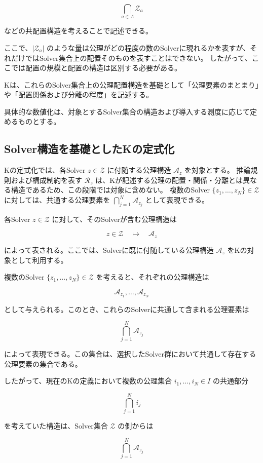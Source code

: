 \[
\bigcap_{a\in A}\mathcal{Z}_a
\]

などの共配置構造を考えることで記述できる。

ここで、$|\mathcal{Z}_a|$ のような量は公理がどの程度の数のSolverに現れるかを表すが、それだけではSolver集合上の配置そのものを表すことはできない。
したがって、ここでは配置の規模と配置の構造は区別する必要がある。

Kは、これらのSolver集合上の公理配置構造を基礎として「公理要素のまとまり」や「配置関係および分離の程度」を記述する。

具体的な数値化は、対象とするSolver集合の構造および導入する測度に応じて定めるものとする。

\subsection{Solver構造を基礎としたKの定式化}

Kの定式化では、各Solver $z\in\mathcal{Z}$ に付随する公理構造 $\mathcal{A}_z$ を対象とする。
推論規則および構成制約を表す $\mathcal{R}_z$ は、Kが記述する公理の配置・関係・分離とは異なる構造であるため、この段階では対象に含めない。
複数のSolver $\{z_1,\ldots,z_N\}\in\mathcal{Z}$ に対しては、共通する公理要素を $\bigcap_{j=1}^{N}\mathcal{A}_{z_j}$ として表現できる。

各Solver $z\in\mathcal{Z}$ に対して、そのSolverが含む公理構造は

\[
z\in\mathcal{Z}
\quad\longmapsto\quad
\mathcal{A}_z
\]

によって表される。ここでは、Solverに既に付随している公理構造 $\mathcal{A}_z$ をKの対象として利用する。

複数のSolver $\{z_1,\ldots,z_N\}\in\mathcal{Z}$ を考えると、それぞれの公理構造は

\[
\mathcal{A}_{z_1},\ldots,\mathcal{A}_{z_N}
\]

として与えられる。このとき、これらのSolverに共通して含まれる公理要素は

\[
\bigcap_{j=1}^{N}\mathcal{A}_{z_j}
\]

によって表現できる。この集合は、選択したSolver群において共通して存在する公理要素の集合である。

したがって、現在のKの定義において複数の公理集合 $i_1,\ldots,i_N\in I$ の共通部分

\[
\bigcap_{j=1}^{N}i_j
\]

を考えていた構造は、Solver集合 $\mathcal{Z}$ の側からは

\[
\bigcap_{j=1}^{N}\mathcal{A}_{z_j}
\]

